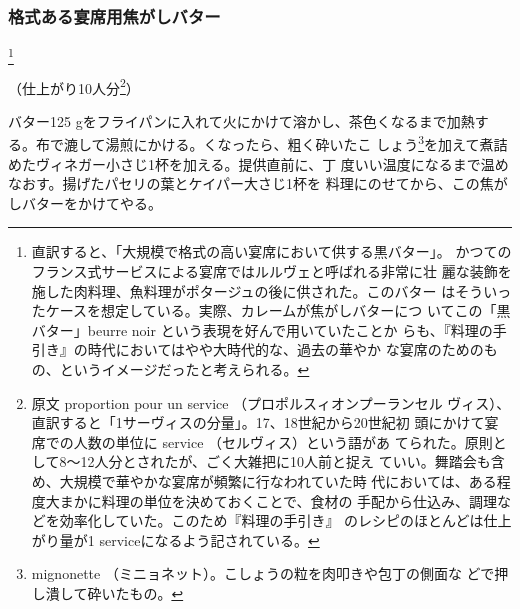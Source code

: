 \begin{recette}
\maeaki

\hypertarget{beurre-noir-pour-les-grands-services}{%
\subsubsection{格式ある宴席用焦がしバター}\label{beurre-noir-pour-les-grands-services}}

\footnote{直訳すると、「大規模で格式の高い宴席において供する黒バター」。
  かつてのフランス式サービスによる宴席ではルルヴェと呼ばれる非常に壮
  麗な装飾を施した肉料理、魚料理がポタージュの後に供された。このバター
  はそういったケースを想定している。実際、カレームが焦がしバターにつ
  いてこの「黒バター」beurre noir という表現を好んで用いていたことか
  らも、『料理の手引き』の時代においてはやや大時代的な、過去の華やか
  な宴席のためのもの、というイメージだったと考えられる。}

 

（仕上がり10人分\footnote{原文 proportion pour un service
  （プロポルスィオンプーランセル
  ヴィス）、直訳すると「1サーヴィスの分量」。17、18世紀から20世紀初
  頭にかけて宴席での人数の単位に service （セルヴィス）という語があ
  てられた。原則として8〜12人分とされたが、ごく大雑把に10人前と捉え
  ていい。舞踏会も含め、大規模で華やかな宴席が頻繁に行なわれていた時
  代においては、ある程度大まかに料理の単位を決めておくことで、食材の
  手配から仕込み、調理などを効率化していた。このため『料理の手引き』
  のレシピのほとんどは仕上がり量が1 serviceになるよう記されている。}）

バター125 gをフライパンに入れて火にかけて溶かし、茶色くなるまで加熱す
る。布で漉して湯煎にかける。くなったら、粗く砕いたこ
しょう\footnote{mignonette
  （ミニョネット）。こしょうの粒を肉叩きや包丁の側面な
  どで押し潰して砕いたもの。}を加えて煮詰めたヴィネガー小さじ1杯を加える。提供直前に、丁
度いい温度になるまで温めなおす。揚げたパセリの葉とケイパー大さじ1杯を
料理にのせてから、この焦がしバターをかけてやる。

\maeaki

\hypertarget{beurre-de-noisette}{%
}
\end{recette}
